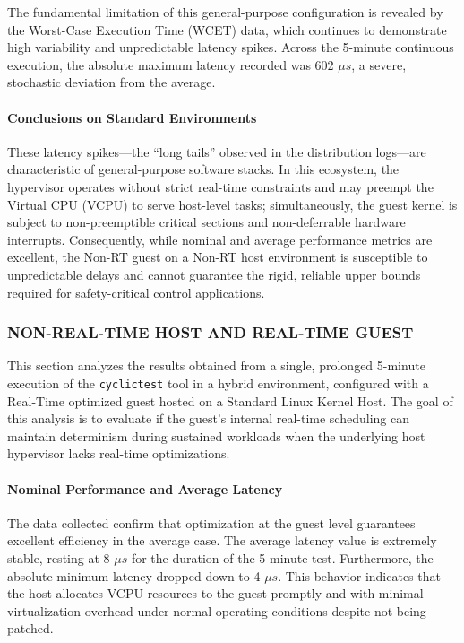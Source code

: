 The fundamental limitation of this general-purpose configuration is
revealed by the Worst-Case Execution Time (WCET) data, which continues
to demonstrate high variability and unpredictable latency spikes. Across
the 5-minute continuous execution, the absolute maximum latency recorded
was 602 $\mu s$, a severe, stochastic deviation from the average.

\paragraph{Conclusions on Standard
Environments}\label{conclusions-on-standard-environments}

These latency spikes---the ``long tails'' observed in the distribution
logs---are characteristic of general-purpose software stacks. In this
ecosystem, the hypervisor operates without strict real-time constraints
and may preempt the Virtual CPU (VCPU) to serve host-level tasks;
simultaneously, the guest kernel is subject to non-preemptible critical
sections and non-deferrable hardware interrupts. Consequently, while
nominal and average performance metrics are excellent, the Non-RT guest
on a Non-RT host environment is susceptible to unpredictable delays and
cannot guarantee the rigid, reliable upper bounds required for
safety-critical control applications.

\subsubsection{NON-REAL-TIME HOST AND REAL-TIME
GUEST}\label{non-real-time-host-and-real-time-guest}

This section analyzes the results obtained from a single, prolonged
5-minute execution of the \texttt{cyclictest} tool in a hybrid
environment, configured with a Real-Time optimized guest hosted on a
Standard Linux Kernel Host. The goal of this analysis is to evaluate if
the guest's internal real-time scheduling can maintain determinism
during sustained workloads when the underlying host hypervisor lacks
real-time optimizations.

\paragraph{Nominal Performance and Average
Latency}\label{nominal-performance-and-average-latency}

The data collected confirm that optimization at the guest level
guarantees excellent efficiency in the average case. The average latency
value is extremely stable, resting at 8 $\mu s$ for the duration of the
5-minute test. Furthermore, the absolute minimum latency dropped down to
4 $\mu s$. This behavior indicates that the host allocates VCPU resources to
the guest promptly and with minimal virtualization overhead under normal
operating conditions despite not being patched.

